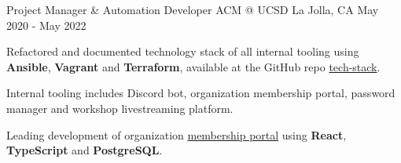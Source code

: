 \begin{cventries}
{    }
    \vspace{6mm}
  \cventry
  {Project Manager \& Automation Developer}
  {ACM @ UCSD}
  {La Jolla, CA}
  {May 2020 - May 2022}
  {
    \begin{cvitems}
      \item {Refactored and documented technology stack of all internal tooling using \textbf{Ansible}, \textbf{Vagrant} and \textbf{Terraform}, available at the GitHub repo \href{https://github.com/acmucsd/tech-stack}{tech-stack}.}
      \item {Internal tooling includes Discord bot, organization membership portal, password manager and workshop livestreaming platform.}
      \item {Leading development of organization \href{https://github.com/acmucsd/membership-portal-ui}{membership portal} using \textbf{React}, \textbf{TypeScript} and \textbf{PostgreSQL}.}
    \end{cvitems}
  }
    \vspace{6mm}
\end{cventries}
